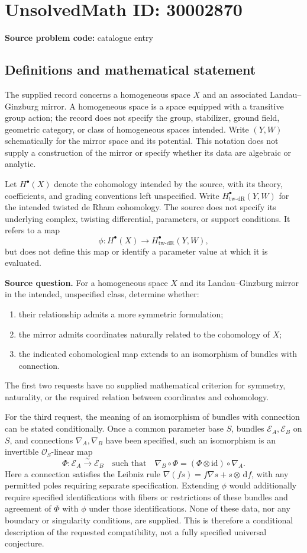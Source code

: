 \documentclass[11pt]{article}
\newcommand{\dd}{\,\mathrm{d}}
\begin{document}
\section*{UnsolvedMath ID: 30002870}
\textbf{Source problem code:} catalogue entry
\subsection{Definitions and mathematical statement}
The supplied record concerns a homogeneous space \(X\) and an associated Landau--Ginzburg mirror. A homogeneous space is a space equipped with a transitive group action; the record does not specify the group, stabilizer, ground field, geometric category, or class of homogeneous spaces intended. Write \((Y,W)\) schematically for the mirror space and its potential. This notation does not supply a construction of the mirror or specify whether its data are algebraic or analytic.

Let \(H^\bullet(X)\) denote the cohomology intended by the source, with its theory, coefficients, and grading conventions left unspecified. Write \(H^\bullet_{\mathrm{tw\text{-}dR}}(Y,W)\) for the intended twisted de Rham cohomology. The source does not specify its underlying complex, twisting differential, parameters, or support conditions. It refers to a map
\[
\phi\colon H^\bullet(X)\longrightarrow H^\bullet_{\mathrm{tw\text{-}dR}}(Y,W),
\]
but does not define this map or identify a parameter value at which it is evaluated.

\textbf{Source question.} For a homogeneous space \(X\) and its Landau--Ginzburg mirror in the intended, unspecified class, determine whether:
\begin{enumerate}
\item their relationship admits a more symmetric formulation;
\item the mirror admits coordinates naturally related to the cohomology of \(X\);
\item the indicated cohomological map extends to an isomorphism of bundles with connection.
\end{enumerate}
The first two requests have no supplied mathematical criterion for symmetry, naturality, or the required relation between coordinates and cohomology.

For the third request, the meaning of an isomorphism of bundles with connection can be stated conditionally. Once a common parameter base \(S\), bundles \(\mathcal E_A,\mathcal E_B\) on \(S\), and connections \(\nabla_A,\nabla_B\) have been specified, such an isomorphism is an invertible \(\mathcal O_S\)-linear map
\[
\Phi\colon\mathcal E_A\xrightarrow{\sim}\mathcal E_B
\quad\text{such that}\quad
\nabla_B\circ\Phi=(\Phi\otimes\mathrm{id})\circ\nabla_A.
\]
Here a connection satisfies the Leibniz rule \(\nabla(fs)=f\nabla s+s\otimes\dd f\), with any permitted poles requiring separate specification. Extending \(\phi\) would additionally require specified identifications with fibers or restrictions of these bundles and agreement of \(\Phi\) with \(\phi\) under those identifications. None of these data, nor any boundary or singularity conditions, are supplied. This is therefore a conditional description of the requested compatibility, not a fully specified universal conjecture.
\end{document}
